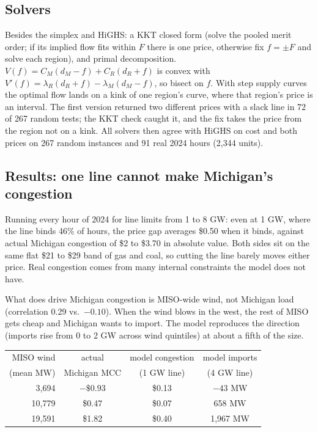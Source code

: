 \documentclass[11pt]{article}
\begin{document}
\subsection{Solvers}
Besides the simplex and HiGHS: a KKT closed form (solve the pooled merit order; if its implied flow fits within $F$ there is one price, otherwise fix $f = \pm F$ and solve each region), and primal decomposition. $V(f) = C_M(d_M - f) + C_R(d_R + f)$ is convex with $V'(f) = \lambda_R(d_R + f) - \lambda_M(d_M - f)$, so bisect on $f$. With step supply curves the optimal flow lands on a kink of one region's curve, where that region's price is an interval. The first version returned two different prices with a slack line in 72 of 267 random tests; the KKT check caught it, and the fix takes the price from the region not on a kink. All solvers then agree with HiGHS on cost and both prices on 267 random instances and 91 real 2024 hours (2{,}344 units).

\subsection{Results: one line cannot make Michigan's congestion}
Running every hour of 2024 for line limits from 1 to 8 GW: even at 1 GW, where the line binds 46\% of hours, the price gap averages \$0.50 when it binds, against actual Michigan congestion of \$2 to \$3.70 in absolute value. Both sides sit on the same flat \$21 to \$29 band of gas and coal, so cutting the line barely moves either price. Real congestion comes from many internal constraints the model does not have.

What does drive Michigan congestion is MISO-wide wind, not Michigan load (correlation 0.29 vs.\ $-0.10$). When the wind blows in the west, the rest of MISO gets cheap and Michigan wants to import. The model reproduces the direction (imports rise from 0 to 2 GW across wind quintiles) at about a fifth of the size.

\begin{center}
\begin{tabular}{@{}rccc@{}}
\toprule
MISO wind & actual & model congestion & model imports \\
(mean MW) & Michigan MCC & (1 GW line) & (4 GW line) \\
\midrule
3{,}694 & $-\$0.93$ & \$0.13 & $-43$ MW \\
10{,}779 & \$0.47 & \$0.07 & 658 MW \\
19{,}591 & \$1.82 & \$0.40 & 1{,}967 MW \\
\bottomrule
\end{tabular}
\end{center}
\end{document}
